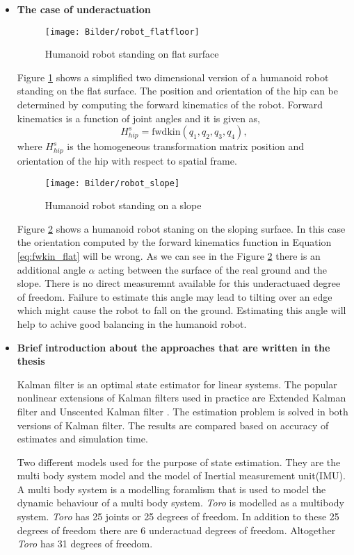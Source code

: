 \begin{itemize}
    \item \textbf{The case of underactuation}
     \begin{figure}[h]
	    \centering
    	\texttt{[image: Bilder/robot\_flatfloor]}
	    \caption{Humanoid robot standing on flat surface}	
	    \label{fig:flat_floor}
    \end{figure}
   Figure \ref{fig:flat_floor} shows a simplified two dimensional version of a humanoid robot standing on the flat surface. The position and orientation of the hip can be determined by computing the forward kinematics of the robot. Forward kinematics is a function of joint angles and it is given as,
    \begin{equation}
    \label{eq:fwkin_flat}
    H_{hip}^s = \text{fwdkin}(q_1,q_2,q_3,q_4),
    \end{equation}
    where $H_{hip}^s$ is the homogeneous transformation matrix position and orientation of the hip with respect to spatial frame. 
    \begin{figure}[h]
	    \centering
    	\texttt{[image: Bilder/robot\_slope]}
	    \caption{Humanoid robot standing on a slope}	
	    \label{fig:slope}
    \end{figure}

    Figure \ref{fig:slope} shows a humanoid robot staning on the sloping surface. In this case the orientation computed by the forward kinematics function in Equation \ref{eq:fwkin_flat} will be wrong. As we can see in the Figure \ref{fig:slope} there is an additional angle $\alpha$ acting between the surface of the real ground and the slope. There is no direct measuremnt available for this underactuaed degree of freedom. Failure to estimate this angle may lead to  tilting over an edge which might cause the robot to fall on the ground. Estimating this angle will help to achive good balancing in the humanoid robot.

    \item \textbf{Brief introduction about the approaches that are written in the thesis}
    
    Kalman filter is an optimal state estimator for linear systems. The popular nonlinear extensions of Kalman filters used in practice are Extended Kalman filter and Unscented Kalman filter \citep{oli12}\citep{atk12}\citep{bloe12}. The estimation problem is solved in both versions of Kalman filter. The results are compared based on accuracy of estimates and simulation time.

    Two different models used for the purpose of state estimation. They are the multi body system model and the model of Inertial measurement unit(IMU). A multi body system is a modelling foramlism that is used to model the dynamic behaviour of a multi body system. \emph{Toro} is modelled as a multibody system. \emph{Toro} has 25 joints or 25 degrees of freedom. In addition to these 25 degrees of freedom there are 6 underactuad degrees of freedom. Altogether \emph{Toro} has 31 degrees of freedom.
\end{itemize}
